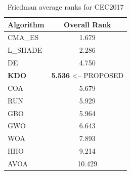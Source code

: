 \begin{table}[H]
\centering\small
\caption{Friedman average ranks for CEC2017}
\label{tab:cec2017_friedman}
\begin{tabular}{lc}
\toprule
\textbf{Algorithm} & \textbf{Overall Rank} \\
\midrule
CMA_ES & 1.679 \\
L_SHADE & 2.286 \\
DE & 4.750 \\
\textbf{KDO} & \textbf{5.536}  <-- PROPOSED \\
COA & 5.679 \\
RUN & 5.929 \\
GBO & 5.964 \\
GWO & 6.643 \\
WOA & 7.893 \\
HHO & 9.214 \\
AVOA & 10.429 \\
\bottomrule
\end{tabular}
\end{table}
